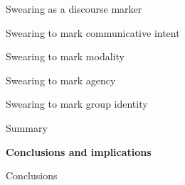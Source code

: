 \begin{listWWNumixleveli}
\begin{listWWNumixlevelii}
\begin{listWWNumixleveliii}
\end{listWWNumixleveliii}
\item 
\begin{styleListParagraph}
Swearing as a discourse marker 
\end{styleListParagraph}


\setcounter{listWWNumixleveliii}{0}
\begin{listWWNumixleveliii}
\item 
\begin{styleListParagraph}
Swearing to mark communicative intent
\end{styleListParagraph}

\item 
\begin{styleListParagraph}
Swearing to mark modality
\end{styleListParagraph}

\item 
\begin{styleListParagraph}
Swearing to mark agency
\end{styleListParagraph}

\item 
\begin{styleListParagraph}
Swearing to mark group identity 
\end{styleListParagraph}

\end{listWWNumixleveliii}
\item 
\begin{styleListParagraph}
Summary 
\end{styleListParagraph}

\end{listWWNumixlevelii}
\end{listWWNumixleveli}
\setcounter{listWWNumiileveli}{0}
\begin{listWWNumiileveli}
\item 
\begin{styleListParagraph}
\textbf{Conclusions and implications }
\end{styleListParagraph}

\end{listWWNumiileveli}
\setcounter{listWWNumxleveli}{7}
\begin{listWWNumxleveli}
\item 
\setcounter{listWWNumxlevelii}{0}
\begin{listWWNumxlevelii}
\item 
\begin{styleListParagraph}
Conclusions 
\end{styleListParagraph}

\end{listWWNumxlevelii}
\end{listWWNumxleveli}
